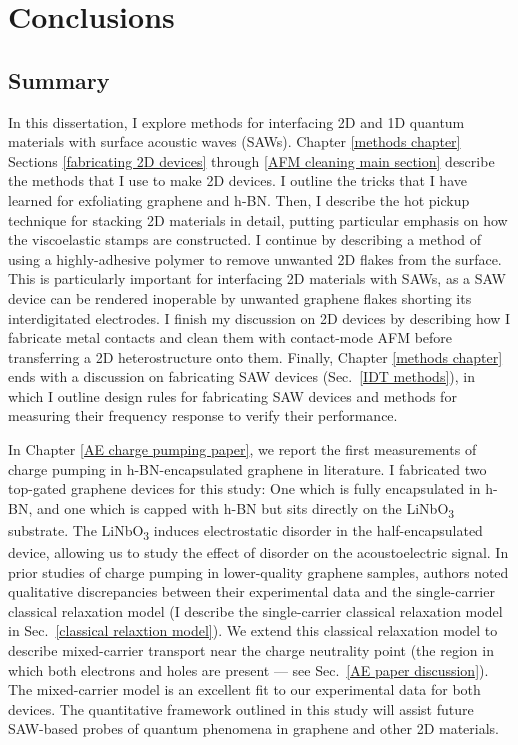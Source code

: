 \documentclass{beavtex_dub_edit}
\begin{document}
\chapter{Conclusions} \label{conclusions chapter}

\section{Summary}
In this dissertation, I explore methods for interfacing 2D and 1D quantum materials with surface acoustic waves (SAWs). Chapter \ref{methods chapter} Sections \ref{fabricating 2D devices} through \ref{AFM cleaning main section} describe the methods that I use to make 2D devices. I outline the tricks that I have learned for exfoliating graphene and h-BN. Then, I describe the hot pickup technique for stacking 2D materials in detail, putting particular emphasis on how the viscoelastic stamps are constructed. I continue by describing a method of using a highly-adhesive polymer to remove unwanted 2D flakes from the surface. This is particularly important for interfacing 2D materials with SAWs, as a SAW device can be rendered inoperable by unwanted graphene flakes shorting its interdigitated electrodes. I finish my discussion on 2D devices by describing how I fabricate metal contacts and clean them with contact-mode AFM before transferring a 2D heterostructure onto them. Finally, Chapter \ref{methods chapter} ends with a discussion on fabricating SAW devices (Sec.\ \ref{IDT methods}), in which I outline design rules for fabricating SAW devices and methods for measuring their frequency response to verify their performance.

In Chapter \ref{AE charge pumping paper}, we report the first measurements of charge pumping in h-BN-encapsulated graphene in literature. I fabricated two top-gated graphene devices for this study: One which is fully encapsulated in h-BN, and one which is capped with h-BN but sits directly on the LiNbO\textsubscript{3} substrate. The LiNbO\textsubscript{3} induces electrostatic disorder in the half-encapsulated device, allowing us to study the effect of disorder on the acoustoelectric signal. In prior studies of charge pumping in lower-quality graphene samples, authors noted qualitative discrepancies between their experimental data and the single-carrier classical relaxation model (I describe the single-carrier classical relaxation model in Sec.\ \ref{classical relaxtion model}). We extend this classical relaxation model to describe mixed-carrier transport near the charge neutrality point (the region in which both electrons and holes are present — see Sec.\ \ref{AE paper discussion}). The mixed-carrier model is an excellent fit to our experimental data for both devices. The quantitative framework outlined in this study will assist future SAW-based probes of quantum phenomena in graphene and other 2D materials.
\end{document}
